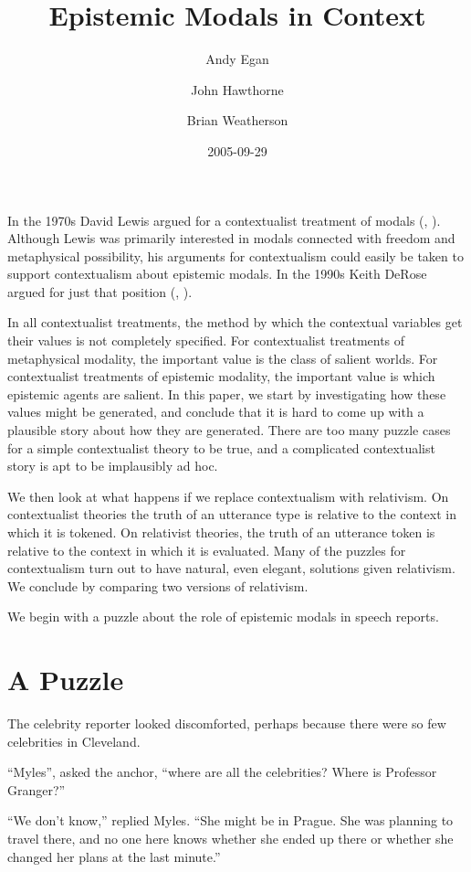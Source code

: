 \documentclass[
  11pt,
  letterpaper,
  DIV=11,
  numbers=noendperiod]{scrartcl}
\title{Epistemic Modals in Context}
\author{Andy Egan \and John Hawthorne \and Brian Weatherson}
\date{2005-09-29}
\begin{document}
\maketitle
In the 1970s David Lewis argued for a contextualist treatment of modals
(,
). Although Lewis was primarily
interested in modals connected with freedom and metaphysical
possibility, his arguments for contextualism could easily be taken to
support contextualism about epistemic modals. In the 1990s Keith DeRose
argued for just that position (,
).

In all contextualist treatments, the method by which the contextual
variables get their values is not completely specified. For
contextualist treatments of metaphysical modality, the important value
is the class of salient worlds. For contextualist treatments of
epistemic modality, the important value is which epistemic agents are
salient. In this paper, we start by investigating how these values might
be generated, and conclude that it is hard to come up with a plausible
story about how they are generated. There are too many puzzle cases for
a simple contextualist theory to be true, and a complicated
contextualist story is apt to be implausibly ad hoc.

We then look at what happens if we replace contextualism with
relativism. On contextualist theories the truth of an utterance type is
relative to the context in which it is tokened. On relativist theories,
the truth of an utterance token is relative to the context in which it
is evaluated. Many of the puzzles for contextualism turn out to have
natural, even elegant, solutions given relativism. We conclude by
comparing two versions of relativism.

We begin with a puzzle about the role of epistemic modals in speech
reports.

\section{A Puzzle}\label{a-puzzle}

The celebrity reporter looked discomforted, perhaps because there were
so few celebrities in Cleveland.

``Myles'', asked the anchor, ``where are all the celebrities? Where is
Professor Granger?''

``We don't know,'' replied Myles. ``She might be in Prague. She was
planning to travel there, and no one here knows whether she ended up
there or whether she changed her plans at the last minute.''
\end{document}
